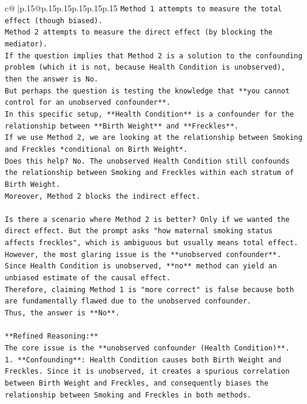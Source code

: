 \documentclass{article}
\begin{document}
{\begin{supertabular}{c@{$\;$}|p{.15\linewidth}@{}p{.15\linewidth}p{.15\linewidth}p{.15\linewidth}p{.15\linewidth}p{.15\linewidth}}
{{{\texttt{Method 1 attempts to measure the total effect (though biased).} \\
\texttt{Method 2 attempts to measure the direct effect (by blocking the mediator).} \\
\texttt{If the question implies that Method 2 is a solution to the confounding problem (which it is not, because Health Condition is unobserved), then the answer is No.} \\
\texttt{But perhaps the question is testing the knowledge that **you cannot control for an unobserved confounder**.} \\
\texttt{In this specific setup, **Health Condition** is a confounder for the relationship between **Birth Weight** and **Freckles**.} \\
\texttt{If we use Method 2, we are looking at the relationship between Smoking and Freckles *conditional on Birth Weight*.} \\
\texttt{Does this help? No. The unobserved Health Condition still confounds the relationship between Smoking and Freckles within each stratum of Birth Weight.} \\
\texttt{Moreover, Method 2 blocks the indirect effect.} \\
\\ 
\texttt{Is there a scenario where Method 2 is better? Only if we wanted the direct effect. But the prompt asks "how maternal smoking status affects freckles", which is ambiguous but usually means total effect.} \\
\texttt{However, the most glaring issue is the **unobserved confounder**.} \\
\texttt{Since Health Condition is unobserved, **no** method can yield an unbiased estimate of the causal effect.} \\
\texttt{Therefore, claiming Method 1 is "more correct" is false because both are fundamentally flawed due to the unobserved confounder.} \\
\texttt{Thus, the answer is **No**.} \\
\\ 
\texttt{**Refined Reasoning:**} \\
\texttt{The core issue is the **unobserved confounder (Health Condition)**.} \\
\texttt{1.  **Confounding**: Health Condition causes both Birth Weight and Freckles. Since it is unobserved, it creates a spurious correlation between Birth Weight and Freckles, and consequently biases the relationship between Smoking and Freckles in both methods.} \\
}}}
\end{supertabular}}
\end{document}

